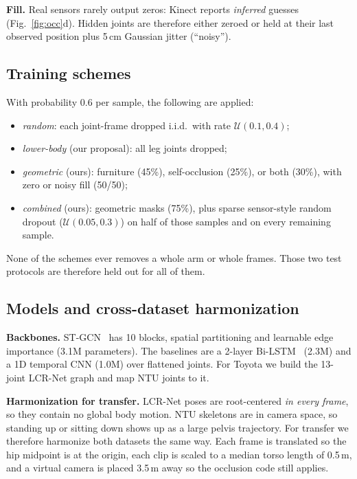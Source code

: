 \documentclass[11pt,twocolumn,letterpaper]{article}
\begin{document}
\textbf{Fill.}
Real sensors rarely output zeros: Kinect reports \emph{inferred} guesses (Fig.~\ref{fig:occ}d).
Hidden joints are therefore either zeroed or held at their last observed position plus 5\,cm Gaussian jitter (``noisy'').

\subsection{Training schemes}
With probability 0.6 per sample, the following are applied:
\begin{itemize}
\item \emph{random}: each joint-frame dropped i.i.d.\ with rate $\mathcal{U}(0.1,0.4)$;
\item \emph{lower-body} (our proposal): all leg joints dropped;
\item \emph{geometric} (ours): furniture (45\%), self-occlusion (25\%), or both (30\%), with zero or noisy fill (50/50);
\item \emph{combined} (ours): geometric masks (75\%), plus sparse sensor-style random dropout ($\mathcal{U}(0.05,0.3)$) on half of those samples and on every remaining sample.
\end{itemize}
None of the schemes ever removes a whole arm or whole frames.
Those two test protocols are therefore held out for all of them.

\subsection{Models and cross-dataset harmonization}
\textbf{Backbones.} ST-GCN~\cite{yan2018stgcn} has 10 blocks, spatial partitioning and learnable edge importance (3.1M parameters).
The baselines are a 2-layer Bi-LSTM~\cite{hochreiter1997lstm} (2.3M) and a 1D temporal CNN (1.0M) over flattened joints.
For Toyota we build the 13-joint LCR-Net graph and map NTU joints to it.

\textbf{Harmonization for transfer.}
LCR-Net poses are root-centered \emph{in every frame}, so they contain no global body motion.
NTU skeletons are in camera space, so standing up or sitting down shows up as a large pelvis trajectory.
For transfer we therefore harmonize both datasets the same way.
Each frame is translated so the hip midpoint is at the origin, each clip is scaled to a median torso length of 0.5\,m, and a virtual camera is placed 3.5\,m away so the occlusion code still applies.

\end{document}
